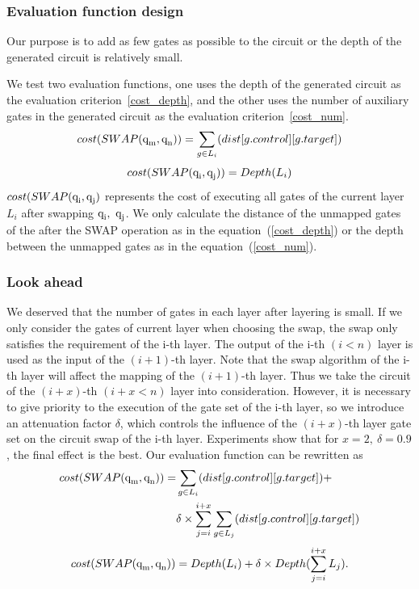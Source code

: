 \documentclass[runningheads]{llncs}
\begin{document}
\subsubsection{Evaluation function design }
Our purpose is to add as few gates as possible to the circuit or the depth of the generated circuit is relatively small.

We test two evaluation functions, one uses the depth of the generated circuit as the evaluation criterion~\ref{cost_depth}, and the other uses the number of auxiliary gates in the generated circuit as the evaluation criterion~\ref{cost_num}.
\begin{equation}
	cost(SWAP(\textup{q}_\textup{m},\textup{q}_\textup{n}))= \sum_{g \in L_{i}}(dist[g.control][g.target])
	\label{cost_num}
\end{equation}
	\begin{equation}
		cost(SWAP(\textup{q}_\textup{i},\textup{q}_\textup{j}))= Depth(L_{i})
		\label{cost_depth}
		\end{equation}
$cost(SWAP(\textup{q}_\textup{i},\textup{q}_\textup{j})$ represents the cost of executing all gates of the current layer $L_i$ 
after swapping $\textup{q}_\textup{i}, \ \textup{q}_\textup{j}$. We only calculate the distance of the unmapped gates of the after the SWAP operation as in the equation~(\ref{cost_depth}) or the depth between the unmapped gates as in the equation~(\ref{cost_num}).

\subsubsection{Look ahead }
We deserved that the number of gates in each layer after layering is small. If we only consider the gates of current layer when choosing the swap, the swap only satisfies the requirement of the i-th layer. The output of the i-th $(i<n)$ layer is used as the input of the $(i+1)$-th layer. Note that the swap algorithm of the i-th layer will affect the mapping of the $(i+1)$-th layer. Thus we take the circuit of the $(i+x)$-th $(i+x< n)$ layer into consideration. However, it is necessary to give priority to the execution of the gate set of the i-th layer, so we introduce an attenuation factor $\delta$, which controls the influence of the $(i+x)$-th layer gate set on the circuit swap of the i-th layer. Experiments show that for $x=2,\ \delta=0.9$, the final effect is the best. Our evaluation function can be rewritten as
 \begin{equation}
	 	\begin{aligned}
			cost(SWAP(\textup{q}_\textup{m},\textup{q}_\textup{n}))=&\sum_{g \in L_{i}}(dist[g.control][g.target])+\\
	&\delta \times \sum_{j=i}^{i+x}\sum_{g \in L_{j}}(dist[g.control][g.target])
	\label{cost_num}
	\end{aligned}
 \end{equation}
	\begin{equation}
		cost(SWAP(\textup{q}_\textup{m},\textup{q}_\textup{n}))= Depth(L_{i})+\delta \times Depth(\sum_{j=i}^{i+x}L_{j}).
		\label{cost_depth}
		\end{equation}
\end{document}
